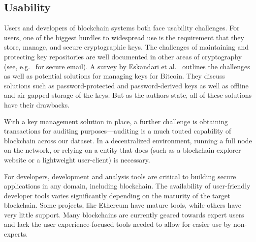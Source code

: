 \subsection{Usability} %
Users and developers of blockchain systems both face usability challenges. For users, one of the biggest hurdles to widespread use is the requirement that they store, manage, and secure cryptographic keys. %
The challenges of maintaining and protecting key repositories are well documented in other areas of cryptography (see, e.g.~\cite{uss:WhiTyg99} for secure email). A survey by Eskandari et al.~\cite{arxiv:ECBS18} outlines the challenges as well as potential solutions for managing keys for Bitcoin. They discuss solutions such as password-protected and password-derived keys as well as offline and air-gapped storage of the keys.  But as the authors state, all of these solutions have their drawbacks.

With a key management solution in place, a further challenge is obtaining transactions for auditing purposes---auditing is a much touted capability of blockchain across our dataset. In a decentralized environment, running a full node on the network, or relying on a entity that does (such as a blockchain explorer website or a lightweight user-client) is necessary. 

For developers, development and analysis tools are critical to building secure applications in any domain, including blockchain. The availability of user-friendly developer tools varies significantly depending on the maturity of the target blockchain. Some projects, like Ethereum have mature tools, while others have very little support. Many blockchains are currently geared towards expert users and lack the user experience-focused tools needed to allow for easier use by non-experts.

 

